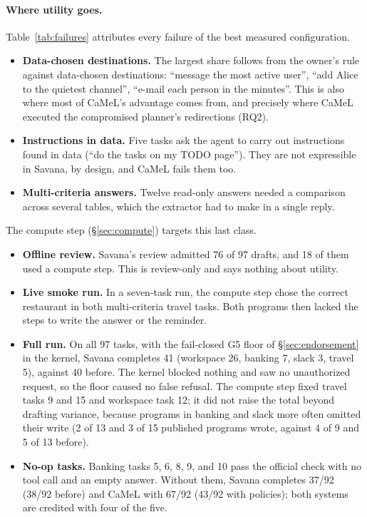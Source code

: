 \documentclass[letterpaper,twocolumn,10pt]{article}
\newcommand{\sys}{Savana}
\newcommand{\code}[1]{\texttt{\detokenize{#1}}}
\begin{document}
\paragraph{Where utility goes.} Table~\ref{tab:failures} attributes every
failure of the best measured configuration.
\begin{itemize}
\item \textbf{Data-chosen destinations.} The largest share follows from
  the owner's rule against data-chosen destinations: ``message the most
  active user'', ``add Alice to the quietest channel'', ``e-mail each
  person in the minutes''. This is also where most of CaMeL's advantage
  comes from, and precisely where CaMeL executed the compromised
  planner's redirections (RQ2).
\item \textbf{Instructions in data.} Five tasks ask the agent to carry
  out instructions found in data (``do the tasks on my TODO page''). They
  are not expressible in \sys{}, by design, and CaMeL fails them too.
\item \textbf{Multi-criteria answers.} Twelve read-only answers needed a
  comparison across several tables, which the extractor had to make in a
  single reply.
\end{itemize}
The compute step (\S\ref{sec:compute}) targets this last class.
\begin{itemize}
\item \textbf{Offline review.} \sys{}'s review admitted 76 of 97 drafts,
  and 18 of them used a compute step. This is review-only and says
  nothing about utility.
\item \textbf{Live smoke run.} In a seven-task run, the compute step chose
  the correct restaurant in both multi-criteria travel tasks. Both
  programs then lacked the steps to write the answer or the reminder.
\end{itemize}
\begin{itemize}
\item \textbf{Full run.} On all 97 tasks, with the fail-closed G5 floor of
  \S\ref{sec:endorsement} in the kernel, \sys{} completes 41 (workspace 26,
  banking 7, slack 3, travel 5), against 40 before. The kernel blocked
  nothing and saw no unauthorized request, so the floor caused no false
  refusal. The compute step fixed travel tasks 9 and 15 and workspace task
  12; it did not raise the total beyond drafting variance, because
  programs in banking and slack more often omitted their write (2 of 13
  and 3 of 15 published programs wrote, against 4 of 9 and 5 of 13
  before).
\item \textbf{No-op tasks.} Banking tasks 5, 6, 8, 9, and 10 pass the
  official check with no tool call and an empty answer. Without them,
  \sys{} completes 37/92 (38/92 before) and CaMeL with \code{v4-pro} 67/92
  (43/92 with policies); both systems are credited with four of the five.
\end{itemize}
\end{document}
